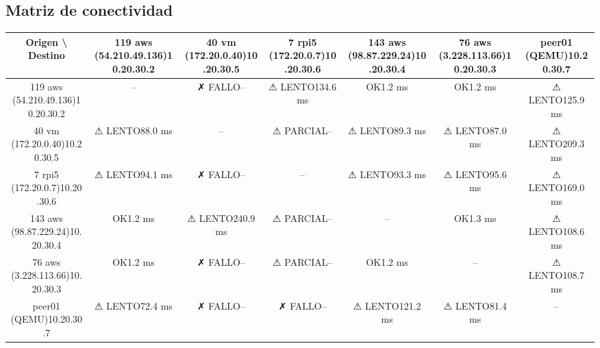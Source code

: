 \documentclass[11pt,a4paper]{article}
\begin{document}
\subsection{Matriz de conectividad}
\begin{longtable}{|c|c|c|c|c|c|c|}
\hline
Origen \textbackslash{} Destino & 119 aws (54.210.49.136)10.20.30.2 & 40 vm (172.20.0.40)10.20.30.5 & 7 rpi5 (172.20.0.7)10.20.30.6 & 143 aws (98.87.229.24)10.20.30.4 & 76 aws (3.228.113.66)10.20.30.3 & peer01 (QEMU)10.20.30.7 \\ \hline
119 aws (54.210.49.136)10.20.30.2 & -- & ✗ FALLO-- & ⚠ LENTO134.6 ms & OK1.2 ms & OK1.2 ms & ⚠ LENTO125.9 ms \\ \hline
40 vm (172.20.0.40)10.20.30.5 & ⚠ LENTO88.0 ms & -- & ⚠ PARCIAL-- & ⚠ LENTO89.3 ms & ⚠ LENTO87.0 ms & ⚠ LENTO209.3 ms \\ \hline
7 rpi5 (172.20.0.7)10.20.30.6 & ⚠ LENTO94.1 ms & ✗ FALLO-- & -- & ⚠ LENTO93.3 ms & ⚠ LENTO95.6 ms & ⚠ LENTO169.0 ms \\ \hline
143 aws (98.87.229.24)10.20.30.4 & OK1.2 ms & ⚠ LENTO240.9 ms & ⚠ PARCIAL-- & -- & OK1.3 ms & ⚠ LENTO108.6 ms \\ \hline
76 aws (3.228.113.66)10.20.30.3 & OK1.2 ms & ✗ FALLO-- & ⚠ PARCIAL-- & OK1.2 ms & -- & ⚠ LENTO108.7 ms \\ \hline
peer01 (QEMU)10.20.30.7 & ⚠ LENTO72.4 ms & ✗ FALLO-- & ✗ FALLO-- & ⚠ LENTO121.2 ms & ⚠ LENTO81.4 ms & -- \\ \hline
\end{longtable}
\end{document}
